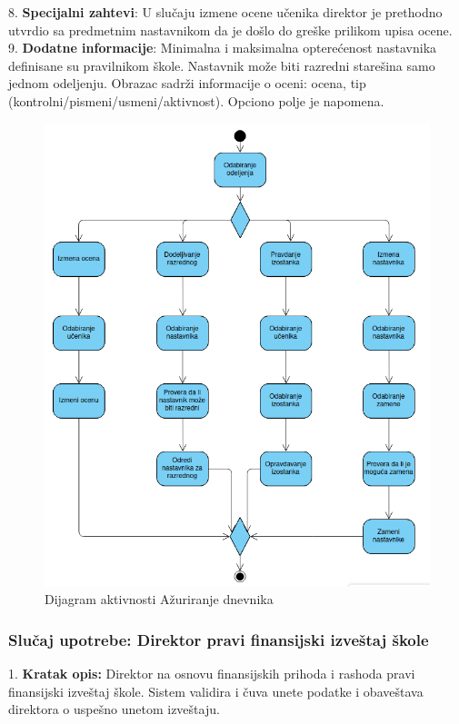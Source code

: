 \documentclass{article}
\begin{document}
8. \textbf{Specijalni zahtevi}: U slučaju izmene ocene učenika direktor je prethodno utvrdio sa predmetnim nastavnikom da je došlo do greške prilikom upisa ocene. \\

9. \textbf{Dodatne informacije}: Minimalna i maksimalna opterećenost nastavnika definisane su pravilnikom škole. Nastavnik može biti razredni starešina samo jednom odeljenju. Obrazac sadrži informacije o oceni: ocena, tip (kontrolni/pismeni/usmeni/aktivnost). Opciono polje je napomena. \\


\begin{figure} [!ht]
    \begin{center}
        \includegraphics[scale=0.4]{imgs/Dijagram_aktivnosti_direktor_azurira_dnevnik.png}
    \end{center}
\caption{Dijagram aktivnosti Ažuriranje dnevnika}
\end{figure}

\newpage
\subsubsection{Slučaj upotrebe: Direktor pravi finansijski izveštaj škole}
1. \textbf{Kratak opis:} Direktor na osnovu finansijskih prihoda i rashoda pravi finansijski izveštaj škole. Sistem validira i čuva unete podatke i obaveštava direktora o uspešno unetom izveštaju. \\
\end{document}
